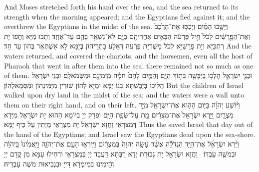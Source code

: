 {And Moses stretched forth his hand over the sea, and the sea returned to its strength when the morning appeared; and the Egyptians fled against it; and the \lord\space overthrew the Egyptians in the midst of the sea.}{}
{וַיָּשֻׁ֣בוּ הַמַּ֗יִם וַיְכַסּ֤וּ אֶת־הָרֶ֙כֶב֙ וְאֶת־הַפָּ֣רָשִׁ֔ים לְכֹל֙ חֵ֣יל פַּרְעֹ֔ה הַבָּאִ֥ים אַחֲרֵיהֶ֖ם בַּיָּ֑ם לֹֽא־נִשְׁאַ֥ר בָּהֶ֖ם עַד־אֶחָֽד׃
}
{וְתָבוּ מַיָּא וַחֲפוֹ יָת רְתִכַּיָּא וְיָת פָּרָשַׁיָּא לְכֹל מַשְׁרְיָת פַּרְעֹה דְּאַלָע בָּתְרֵיהוֹן בְּיַמָּא לָא אִשְׁתְּאַר בְּהוֹן עַד חַד׃}
{And the waters returned, and covered the chariots, and the horsemen, even all the host of Pharaoh that went in after them into the sea; there remained not so much as one of them.}{}
{וּבְנֵ֧י יִשְׂרָאֵ֛ל הָלְכ֥וּ בַיַּבָּשָׁ֖ה בְּת֣וֹךְ הַיָּ֑ם וְהַמַּ֤יִם לָהֶם֙ חֹמָ֔ה מִֽימִינָ֖ם וּמִשְּׂמֹאלָֽם׃}
{וּבְנֵי יִשְׂרָאֵל הַלִּיכוּ בְּיַבֶּשְׁתָּא בְּגוֹ יַמָּא וּמַיָּא לְהוֹן שׁוּרִין מִיַּמִּינְהוֹן וּמִסְּמָאלְהוֹן׃}
{But the children of Israel walked upon dry land in the midst of the sea; and the waters were a wall unto them on their right hand, and on their left.}{}
{וַיּ֨וֹשַׁע יְהֹוָ֜ה בַּיּ֥וֹם הַה֛וּא אֶת־יִשְׂרָאֵ֖ל מִיַּ֣ד מִצְרָ֑יִם וַיַּ֤רְא יִשְׂרָאֵל֙ אֶת־מִצְרַ֔יִם מֵ֖ת עַל־שְׂפַ֥ת הַיָּֽם׃
}
{וּפְרַק יְיָ בְּיוֹמָא הַהוּא יָת יִשְׂרָאֵל מִיְּדָא דְּמִצְרָאֵי וַחֲזָא יִשְׂרָאֵל יָת מִצְרָאֵי מָיְתִין עַל כֵּיף יַמָּא׃}
{Thus the \lord\space saved Israel that day out of the hand of the Egyptians; and Israel saw the Egyptians dead upon the sea-shore.}{}
{וַיַּ֨רְא יִשְׂרָאֵ֜ל אֶת־הַיָּ֣ד הַגְּדֹלָ֗ה אֲשֶׁ֨ר עָשָׂ֤ה יְהֹוָה֙ בְּמִצְרַ֔יִם וַיִּֽירְא֥וּ הָעָ֖ם אֶת־יְהֹוָ֑ה וַיַּֽאֲמִ֙ינוּ֙ בַּֽיהֹוָ֔ה וּבְמֹשֶׁ֖ה עַבְדּֽוֹ׃ \petucha 
{}}
{וַחֲזָא יִשְׂרָאֵל יָת גְּבוּרַת יְדָא רַבְּתָא דַּעֲבַד יְיָ בְּמִצְרָאֵי וּדְחִילוּ עַמָּא מִן קֳדָם יְיָ וְהֵימִינוּ בְּמֵימְרָא דַּייָ וּבִנְבִיאוּת מֹשֶׁה עַבְדֵּיהּ׃}
